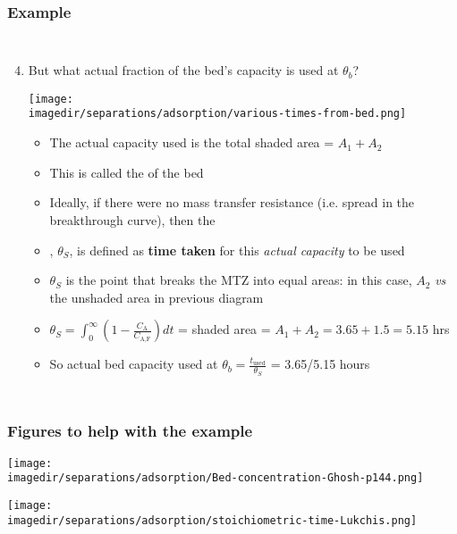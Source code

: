 \begin{frame}\frametitle{Example}
	\vspace{-12pt}
	\begin{columns}[t]
		\begin{enumerate}
			\setcounter{enumi}{3}
			\item	But what actual fraction of the bed's capacity is used at $\theta_b$?		
				\begin{center}
					\texttt{[image: \\imagedir/separations/adsorption/various-times-from-bed.png]}
				\end{center}
				\vspace{-12pt}
				\begin{itemize}
					\item	The actual capacity used is the total shaded area = $A_1 + A_2$
					\item	This is called the {\color{purple}{stoichiometric capacity}} of the bed 
					\item	Ideally, if there were no mass transfer resistance (i.e. spread in the breakthrough curve), then the
					\item	{\color{purple}{stoichiometric time}}, $\theta_S$, is defined as \textbf{time taken} for this \emph{actual capacity} to be used
					\item	$\theta_S$ is the point that breaks the MTZ into equal areas: in this case, $A_2$ \emph{vs} the unshaded area in previous diagram
					\vspace{2pt}
					\item	{\scriptsize $\theta_S = \displaystyle \int_0^{\infty}{\left(1-\frac{C_\text{A}}{C_\text{A,F}} \right)dt}$ = shaded area = $A_1 + A_2 = 3.65 + 1.5 = 5.15$ hrs}
					\item	So actual bed capacity used at $\theta_b = \displaystyle\frac{t_\text{used}}{\theta_S}$ = 3.65/5.15 hours {\color{myOrange}{$\sim71\%$}}  
				\end{itemize}
		\end{enumerate}
	\end{columns}	
\end{frame}

\begin{frame}\frametitle{Figures to help with the example}
	\begin{center}
		\texttt{[image: \\imagedir/separations/adsorption/Bed-concentration-Ghosh-p144.png]}
	\end{center}
	\begin{center}
		\texttt{[image: \\imagedir/separations/adsorption/stoichiometric-time-Lukchis.png]}
	\end{center}
\end{frame}

